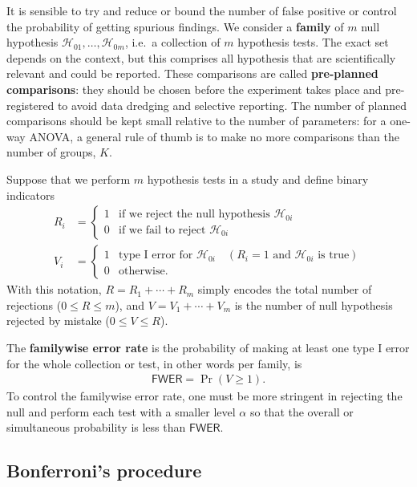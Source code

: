 \documentclass[
  11pt,
  letterpaper,
]{scrbook}
\theoremstyle{definition}
\theoremstyle{definition}
\theoremstyle{remark}
\begin{document}
It is sensible to try and reduce or bound the number of false positive
or control the probability of getting spurious findings. We consider a
\textbf{family} of \(m\) null hypothesis
\(\mathscr{H}_{01}, \ldots, \mathscr{H}_{0m}\), i.e.~a collection of
\(m\) hypothesis tests. The exact set depends on the context, but this
comprises all hypothesis that are scientifically relevant and could be
reported. These comparisons are called \textbf{pre-planned comparisons}:
they should be chosen before the experiment takes place and
pre-registered to avoid data dredging and selective reporting. The
number of planned comparisons should be kept small relative to the
number of parameters: for a one-way ANOVA, a general rule of thumb is to
make no more comparisons than the number of groups, \(K\).

Suppose that we perform \(m\) hypothesis tests in a study and define
binary indicators \begin{align}
R_i &= \begin{cases} 1 & \text{if we reject the null hypothesis }  \mathscr{H}_{0i} \\
0 & \text{if we fail to reject } \mathscr{H}_{0i}
\end{cases}\\
V_i &=\begin{cases} 1 & \text{type I error for } \mathscr{H}_{0i}\quad  (R_i=1 \text{ and  }\mathscr{H}_{0i} \text{ is true}) \\ 0 & \text{otherwise}.
\end{cases}
\end{align} With this notation, \(R=R_1 + \cdots + R_m\) simply encodes
the total number of rejections (\(0 \leq R \leq m\)), and
\(V = V_1 + \cdots + V_m\) is the number of null hypothesis rejected by
mistake (\(0 \leq V \leq R\)).

The \textbf{familywise error rate} is the probability of making at least
one type I error for the whole collection or test, in other words per
family, is \begin{align*}
\mathsf{FWER} = \Pr(V \geq 1).
\end{align*} To control the familywise error rate, one must be more
stringent in rejecting the null and perform each test with a smaller
level \(\alpha\) so that the overall or simultaneous probability is less
than \(\mathsf{FWER}\).

\subsection{Bonferroni's procedure}\label{bonferronis-procedure}
\end{document}
